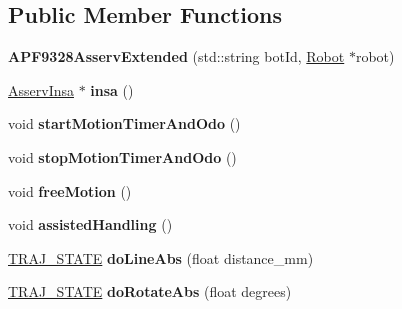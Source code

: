 \subsection*{Public Member Functions}
\begin{DoxyCompactItemize}
\item 
\mbox{\label{classAPF9328AsservExtended_aea0a2b3e2ea50ef90a20d22583db8ba3}} 
{\bfseries A\+P\+F9328\+Asserv\+Extended} (std\+::string bot\+Id, \hyperlink{classRobot}{Robot} $\ast$robot)
\item 
\mbox{\label{classAPF9328AsservExtended_a12777325ac1aafe19c71f7c4db050f78}} 
\hyperlink{classAsservInsa}{Asserv\+Insa} $\ast$ {\bfseries insa} ()
\item 
\mbox{\label{classAPF9328AsservExtended_a54310949c0c6c0dc1e4b0d9655e07c58}} 
void {\bfseries start\+Motion\+Timer\+And\+Odo} ()
\item 
\mbox{\label{classAPF9328AsservExtended_a85fca7d2c0c9c4fd15047dd1b7958e9c}} 
void {\bfseries stop\+Motion\+Timer\+And\+Odo} ()
\item 
\mbox{\label{classAPF9328AsservExtended_aad6e00415748c21069cb307a468af7e6}} 
void {\bfseries free\+Motion} ()
\item 
\mbox{\label{classAPF9328AsservExtended_a2fbf49f8eb9a7492400e9ca207ada202}} 
void {\bfseries assisted\+Handling} ()
\item 
\mbox{\label{classAPF9328AsservExtended_a0395ebe1676d7c13d1cfbfba6a0f616b}} 
\hyperlink{path__manager_8h_adb3360abeb29758da93865c8afcb80eb}{T\+R\+A\+J\+\_\+\+S\+T\+A\+TE} {\bfseries do\+Line\+Abs} (float distance\+\_\+mm)
\item 
\mbox{\label{classAPF9328AsservExtended_a4633b9452dcafa2a89f8403ce5ed7366}} 
\hyperlink{path__manager_8h_adb3360abeb29758da93865c8afcb80eb}{T\+R\+A\+J\+\_\+\+S\+T\+A\+TE} {\bfseries do\+Rotate\+Abs} (float degrees)
\item 
\mbox{\label{classAPF9328AsservExtended_a3b6f96a56ed81998a48240eaa6bf030b}} 

\end{DoxyCompactItemize}
